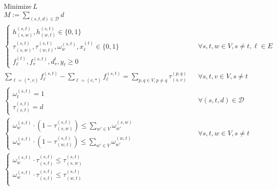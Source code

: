 \documentclass[a4paper,USenglish]{lipics-v2018}
\begin{document}
\begin{align}
& \text{Minimize} ~L \nonumber	&&\\
&M := \sum_{ (s,t,d) \in \mathcal{D}} d &&\\
&\begin{cases}
	h^{(s,t)}_{(s,w)}, h^{(s,t)}_{(w,t)}  \in \{0,1\} \\
	\tau^{(s,t)}_{(s,w)}, \tau^{(s,t)}_{(w,t)},
	\omega^{(s,t)}_{w},
	x^{(t)}_{\ell} 
 \in \{0,1\} \\
 f^{(t)}_{\ell}, f^{(s,t)}_{v}, d^{t}_v, y_{\ell}  \geq 0
\end{cases}
&&\forall  s,t,w \in V, s \neq t, \ell \in E \label{LP:vardef}    
\\
&\sum_{\ell = (*,v)} f^{(s,t)}_{\ell} - 
\sum_{\ell= (v,*)}f^{(s,t)}_{\ell}
= \sum_{ p,q\in V, p\neq q} \tau^{(p,q)}_{(s,v)}
&& \forall s,t,v \in V, s \neq t
\label{LP:flowcons}
 \\
 & 
 \begin{cases}
	 \omega^{(s,t)}_{t} = 1 \\
	 \tau^{(s,t)}_{(s,t)} = d
 \end{cases}
 && \forall (s,t,d) \in \mathcal{D}
 \label{LP:wp_t}
 \\
 &
 \begin{cases*}
    \omega^{(s,t)}_{w} \cdot (1-\tau^{(s,t)}_{(s,w)}) \leq  \sum_{w' \in V} \omega^{(s,w)}_{w'}	\\
    \omega^{(s,t)}_{w} \cdot (1-\tau^{(s,t)}_{(w,t)})  \leq  \sum_{w' \in V} \omega^{(w,t)}_{w'}	    
 \end{cases*}	 
 && \forall s,t,w \in V, s\neq t
 \label{LP:segments}
  \\
 &
 \begin{cases*}
  \omega^{(s,t)}_{w} \cdot \tau^{(s,t)}_{(s,t)} \leq \tau^{(s,t)}_{(s,w)}	\\
 \omega^{(s,t)}_{w}  \cdot \tau^{(s,t)}_{(s,t)} \leq  \tau^{(s,t)}_{(w,t)}\\

\end{cases*}
\end{align}
\end{document}
